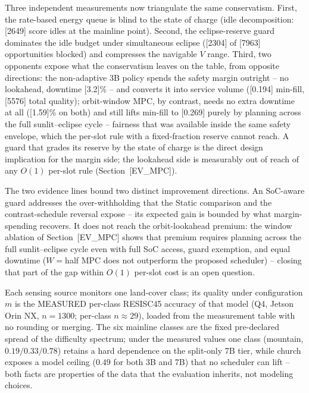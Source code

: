 Three independent measurements now triangulate the same conservatism. First,
the rate-based energy queue is blind to the state of charge (idle
decomposition: [2649] score idles at the mainline point). Second, the
eclipse-reserve guard dominates the idle budget under simultaneous eclipse
([2304] of [7963] opportunities blocked) and compresses the navigable $V$
range. Third, two opponents expose what the conservatism leaves on the
table, from opposite directions: the non-adaptive 3B policy spends the
safety margin outright -- no lookahead, downtime [3.2]\% -- and converts it
into service volume ([0.194] min-fill, [5576] total quality); orbit-window
MPC, by contrast, needs no extra downtime at all ([1.59]\% on both) and
still lifts min-fill to [0.269] purely by planning across the full
sunlit--eclipse cycle -- fairness that was available inside the same safety
envelope, which the per-slot rule with a fixed-fraction reserve cannot
reach. A guard that grades its reserve by the state of charge is the direct
design implication for the margin side; the lookahead side is measurably
out of reach of any $O(1)$ per-slot rule (Section~[EV_MPC]).

The two evidence lines bound two distinct improvement directions. An
SoC-aware guard addresses the over-withholding that the Static comparison
and the contrast-schedule reversal expose -- its expected gain is bounded by
what margin-spending recovers. It does not reach the orbit-lookahead
premium: the window ablation of Section~[EV_MPC] shows that premium requires
planning across the full sunlit--eclipse cycle even with full SoC access,
guard exemption, and equal downtime ($W{=}$half MPC does not outperform the
proposed scheduler) -- closing that part of the gap within $O(1)$ per-slot
cost is an open question.

Each sensing source monitors one land-cover class; its quality under
configuration $m$ is the MEASURED per-class RESISC45 accuracy of that model
(Q4, Jetson Orin NX, $n{=}1300$; per-class $n{\approx}29$), loaded from the
measurement table with no rounding or merging. The six mainline classes are
the fixed pre-declared spread of the difficulty spectrum; under the measured
values one class (mountain, $0.19/0.33/0.78$) retains a hard dependence on
the split-only 7B tier, while church exposes a model ceiling ($0.49$ for
both 3B and 7B) that no scheduler can lift -- both facts are properties of
the data that the evaluation inherits, not modeling choices.

